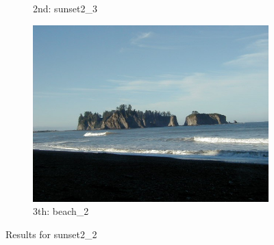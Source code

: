 \begin{itemize}
\begin{figure}[H]
\begin{subfigure}{0.25\textwidth}
        \caption{2nd: sunset2\_3}
    \end{subfigure}%
    \begin{subfigure}{0.25\textwidth}
	  \centering
	  \includegraphics[width=0.9\linewidth]{../input/beach_2.jpg}
	    \caption{3th: beach\_2}
	\end{subfigure}
    \caption{Results for sunset2\_2}
    \label{fig:results_sunset2_2}
\end{figure}

\end{itemize}


